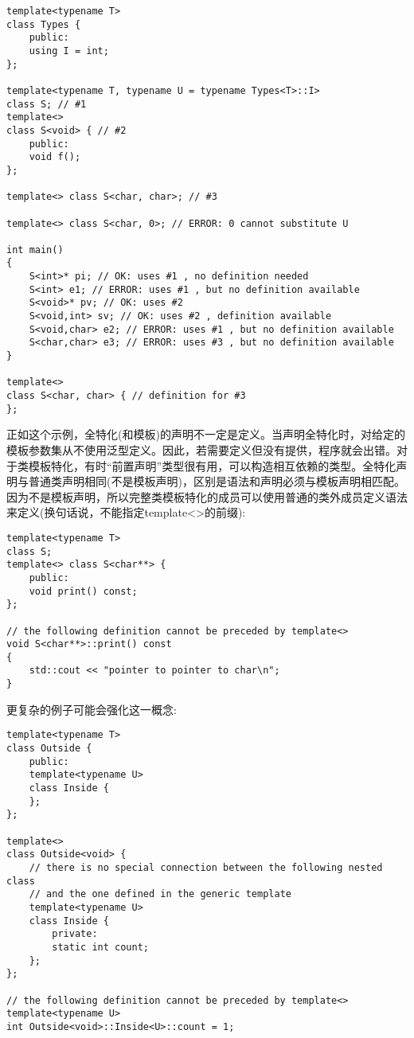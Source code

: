 \begin{lstlisting}[style=styleCXX]
template<typename T>
class Types {
	public:
	using I = int;
};

template<typename T, typename U = typename Types<T>::I>
class S; // #1
template<>
class S<void> { // #2
	public:
	void f();
};

template<> class S<char, char>; // #3

template<> class S<char, 0>; // ERROR: 0 cannot substitute U

int main()
{
	S<int>* pi; // OK: uses #1 , no definition needed
	S<int> e1; // ERROR: uses #1 , but no definition available
	S<void>* pv; // OK: uses #2
	S<void,int> sv; // OK: uses #2 , definition available
	S<void,char> e2; // ERROR: uses #1 , but no definition available
	S<char,char> e3; // ERROR: uses #3 , but no definition available
}

template<>
class S<char, char> { // definition for #3
};
\end{lstlisting}

正如这个示例，全特化(和模板)的声明不一定是定义。当声明全特化时，对给定的模板参数集从不使用泛型定义。因此，若需要定义但没有提供，程序就会出错。对于类模板特化，有时“前置声明”类型很有用，可以构造相互依赖的类型。全特化声明与普通类声明相同(不是模板声明)，区别是语法和声明必须与模板声明相匹配。因为不是模板声明，所以完整类模板特化的成员可以使用普通的类外成员定义语法来定义(换句话说，不能指定template<>的前缀):

\begin{lstlisting}[style=styleCXX]
template<typename T>
class S;
template<> class S<char**> {
	public:
	void print() const;
};

// the following definition cannot be preceded by template<>
void S<char**>::print() const
{
	std::cout << "pointer to pointer to char\n";
}
\end{lstlisting}

更复杂的例子可能会强化这一概念:

\begin{lstlisting}[style=styleCXX]
template<typename T>
class Outside {
	public:
	template<typename U>
	class Inside {
	};
};

template<>
class Outside<void> {
	// there is no special connection between the following nested class
	// and the one defined in the generic template
	template<typename U>
	class Inside {
		private:
		static int count;
	};
};

// the following definition cannot be preceded by template<>
template<typename U>
int Outside<void>::Inside<U>::count = 1;
\end{lstlisting}

